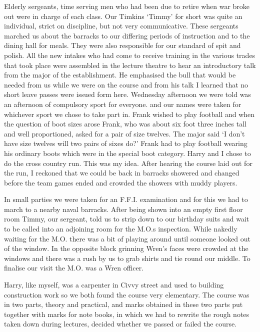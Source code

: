 Elderly sergeants, time serving men who had been due to retire when
war broke out were in charge of each class. Our \sergeant Timkins
`Timmy' for short was quite an individual, strict on discipline, but
not very communicative. These sergeants marched us about the barracks to
our differing periods of instruction and to the dining hall for
meals. They were also responsible for our standard of spit and
polish. All the new intakes who had come to receive training in the
various trades that took place were assembled in the lecture theatre
to hear an introductory talk from the major of the establishment. He
emphasised the bull that would be needed from us while we were on the
course and from his talk I learned that no short leave passes were
issued form here. Wednesday afternoon we were told was an afternoon of
compulsory sport for everyone. and our names were taken for whichever
sport we chose to take part in. Frank wished to play football and when
the question of boot sizes arose Frank, who was about six foot three
inches tall and well proportioned, asked for a pair of size
twelves. The major said `I don't have size twelves will two pairs of
sixes do?' Frank had to play football wearing his ordinary boots which
were in the special boot category. Harry and I chose to do the cross
country run. This was my idea. After hearing the course laid out for
the run, I reckoned that we could be back in barracks showered and
changed before the team games ended and crowded the showers with
muddy players.

In small parties we were taken for an F.F.I. examination and for this we
had to march to a nearby naval barracks. After being shown into an
empty first floor room Timmy, our sergeant, told us to strip down to our
birthday suits and wait to be called into an adjoining room for the
M.O.s inspection. While nakedly waiting for the M.O. there was a bit
of playing around until someone looked out of the window. In the
opposite block grinning Wren's faces were crowded at the windows and
there was a rush by us to grab shirts and tie round our middle. To
finalise our visit the M.O. was a Wren officer.

Harry, like myself, was a carpenter in Civvy street and used to
building construction work so we both found the course very
elementary. The course was in two parts, theory and practical, and
marks obtained in these two parts put together with marks for
note books, in which we had to rewrite the rough notes taken down
during lectures, decided whether we passed or failed the course.

